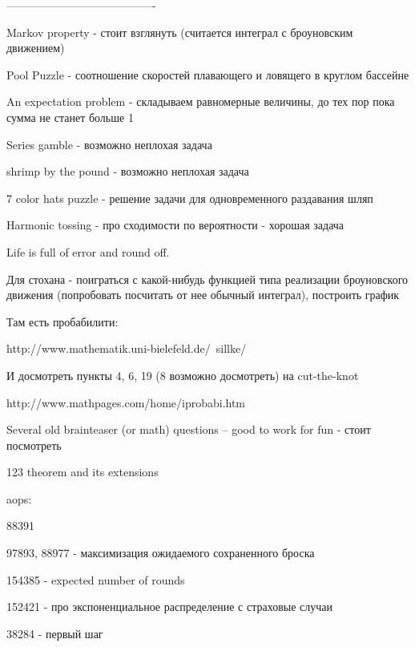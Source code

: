 ----------------------------------------\par



Markov property - стоит взглянуть (считается интеграл с броуновским движением)\par

Pool Puzzle - соотношение скоростей плавающего и ловящего в круглом бассейне \par

An expectation problem - складываем равномерные величины, до тех пор пока сумма не станет больше 1 \par

Series gamble - возможно неплохая задача \par
shrimp by the pound - возможно неплохая задача \par
7 color hats puzzle - решение задачи для одновременного раздавания шляп\par

Harmonic tossing - про сходимости по вероятности - хорошая задача \par

Life is full of error and round off.\par

Для стохана - поиграться с какой-нибудь функцией типа реализации броуновского движения (попробовать посчитать от нее обычный интеграл), построить график \par

Там есть пробабилити: \par
http://www.mathematik.uni-bielefeld.de/~sillke/ \par
И досмотреть пункты 4, 6, 19 (8 возможно досмотреть) на cut-the-knot \par
http://www.mathpages.com/home/iprobabi.htm \par

Several old brainteaser (or math) questions -- good to work for fun - стоит посмотреть \par

123 theorem and its extensions \par

aops:\par
88391\par
97893, 88977 - максимизация ожидаемого сохраненного броска\par
154385 - expected number of rounds \par
152421 - про экспоненциальное распределение с страховые случаи\par
38284 - первый шаг \par

